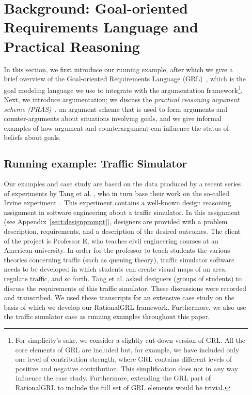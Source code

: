 \section{Background: Goal-oriented Requirements Language and Practical Reasoning}
\label{sect:background}

In this section, we first introduce our running example, after which we give a brief overview of the Goal-oriented Requirements Language (GRL)~\cite{Amyot:2010:EGM:1841349.1841356}, which is the goal modeling language we use to integrate with the argumentation framework\footnote{For simplicity's sake, we consider a slightly cut-down version of GRL. All the core elements of GRL are included but, for example, we have included only one level of contribution strength, where GRL contains different levels of positive and negative contribution. This simplification does not in any way influence the case study. Furthermore, extending the GRL part of RationalGRL to include the full set of GRL elements would be trivial.}. Next, we introduce argumentation; we discuss the \emph{practical reasoning argument scheme (PRAS)}~\cite{atkinson2007}, an argument scheme that is used to form arguments and counter-arguments about situations involving goals, and we give informal examples of how argument and counterargument can influence the status of beliefs about goals.   %

\subsection{Running example: Traffic Simulator}
\label{sect:goals:runningexample}

Our examples and case study are based on the data produced by a recent series of experiments by Tang et al. \cite{TangEtal2018}, who in turn base their work on the so-called Irvine experiment~\cite{UCIworkshop}. This experiment contains a well-known design reasoning assignment in software engineering about a traffic simulator. In this assignment (see Appendix~\ref{sect:designprompt}), designers are provided with a problem description, requirements, and a description of the desired outcomes. The client of the project is Professor E, who teaches civil engineering courses at an American university. In order for the professor to teach students the various theories concerning traffic (such as queuing theory), traffic simulator software needs to be developed in which students can create visual maps of an area, regulate traffic, and so forth. Tang et al. asked designers (groups of students) to discuss the requirements of this traffic simulator. These discussions were recorded and transcribed. We used these transcripts for an extensive case study on the basis of which we develop our RationalGRL framework. Furthermore, we also use the traffic simulator case as running examples throughout this paper. 

